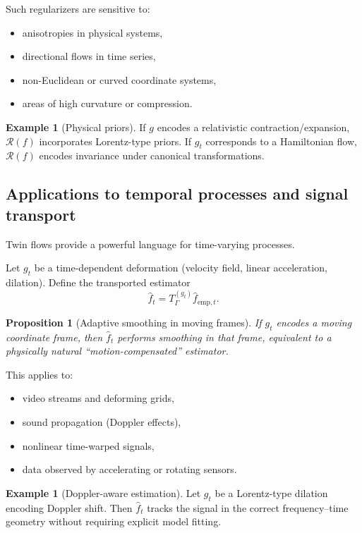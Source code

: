 \documentclass[11pt]{article}
\newtheorem{proposition}[theorem]{Proposition}
\theoremstyle{definition}
\newtheorem{example}[theorem]{Example}
\begin{document}
Such regularizers are sensitive to:
\begin{itemize}[itemsep=2pt]
	\item anisotropies in physical systems,
	\item directional flows in time series,
	\item non-Euclidean or curved coordinate systems,
	\item areas of high curvature or compression.
\end{itemize}

\begin{example}[Physical priors]
	If $g$ encodes a relativistic contraction/expansion, $\mathcal{R}(f)$ incorporates Lorentz-type priors.
	If $g_t$ corresponds to a Hamiltonian flow, $\mathcal{R}(f)$ encodes invariance under canonical transformations.
\end{example}

\subsection{Applications to temporal processes and signal transport}

Twin flows provide a powerful language for time-varying processes.

Let $g_t$ be a time-dependent deformation (velocity field, linear acceleration, dilation).
Define the transported estimator
\[
\widehat f_t = T_\Gamma^{(g_t)} \widehat f_{\mathrm{emp},t}.
\]

\begin{proposition}[Adaptive smoothing in moving frames]
	If $g_t$ encodes a moving coordinate frame, then $\widehat f_t$ performs smoothing in that frame, equivalent to a physically natural “motion-compensated” estimator.
\end{proposition}

This applies to:
\begin{itemize}[itemsep=2pt]
	\item video streams and deforming grids,
	\item sound propagation (Doppler effects),
	\item nonlinear time-warped signals,
	\item data observed by accelerating or rotating sensors.
\end{itemize}

\begin{example}[Doppler-aware estimation]
	Let $g_t$ be a Lorentz-type dilation encoding Doppler shift.
	Then $\widehat f_t$ tracks the signal in the correct frequency–time geometry without requiring explicit model fitting.
\end{example}
\end{document}
